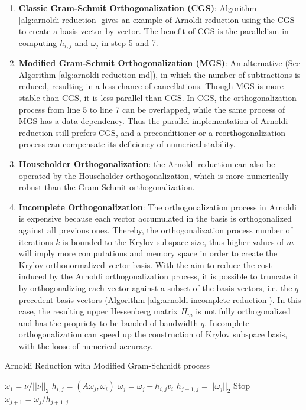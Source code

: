 \begin{enumerate}
	\item \textbf{Classic Gram-Schmit Orthogonalization (CGS)}: Algorithm \ref{alg:arnoldi-reduction} gives an example of Arnoldi reduction using the CGS to create a basis vector by vector. The benefit of CGS is the parallelism in computing $h_{i,j}$ and $\omega_j$ in step 5 and 7.
	\item \textbf{Modified Gram-Schmit Orthogonalization (MGS)}: An alternative (See Algorithm \ref{alg:arnoldi-reduction-md}), in which the number of subtractions is reduced, resulting in a less chance of cancellations. Though MGS is more stable than CGS, it is less parallel than CGS. In CGS, the orthogonalization process from line 5 to line 7 can be overlapped, while the same process of MGS has a data dependency. Thus the parallel implementation of Arnoldi reduction still prefers CGS, and a preconditioner or a reorthogonalization process can compensate its deficiency of numerical stability.
	\item \textbf{Householder Orthogonalization}: the  Arnoldi reduction can also be operated by the Householder orthogonalization, which is more numerically robust than the Gram-Schmit orthogonalization.
	\item \textbf{Incomplete Orthogonalization}: The orthogonalization process in Arnoldi is expensive because each vector accumulated in the basis is orthogonalized against all previous ones. Thereby, the orthogonalization process number of iterations $k$ is bounded to the Krylov subspace size, thus higher values of $m$ will imply more computations and memory space in order to create the Krylov orthonormalized vector basis. With the aim to reduce the cost induced by the Arnoldi orthogonalization process, it is possible to truncate it by orthogonalizing each vector against a subset of the basis vectors, i.e. the $q$ precedent basis vectors (Algorithm \ref{alg:arnoldi-incomplete-reduction}). In this case, the resulting upper Hessenberg matrix $H_m$ is not fully orthogonalized and has the propriety to be banded of bandwidth $q$. Incomplete orthogonalization can speed up the construction of Krylov subspace basis, with the loose of numerical accuracy.
\end{enumerate}

\begin{algorithm}[t]{}
	\caption{Arnoldi Reduction with Modified Gram-Schmidt process}   
	\label{alg:arnoldi-reduction-md}   
	\begin{algorithmic}[1]
		\State $\omega_1=\nu /||\nu||_2$
		\State $h_{i,j}=(A\omega_j,\omega_i)$
		\State $\omega_j=\omega_j-h_{i,j}v_i$
		\EndFor
		\State $h_{j+1,j}=||\omega_j||_2$
		 Stop
		\EndIf
		\State $\omega_{j+1}=\omega_j/h_{j+1,j}$
		\EndFor 
		\EndFunction
	\end{algorithmic}  
\end{algorithm}

